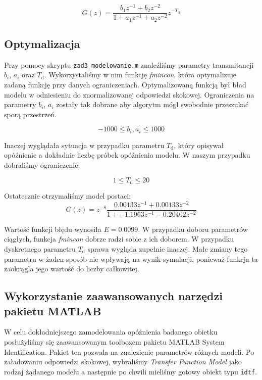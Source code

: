 \begin{equation}
G(z) = \frac{b_{\mathrm{1}} z^{-1} + b_{\mathrm{2}} z^{-2}}{1 + a_{\mathrm{1}} z^{-1} + a_{\mathrm{2}} z^{-2}} z^{-T_{\mathrm{d}}}
\end{equation}

\subsection{Optymalizacja}
Przy pomocy skryptu \verb+zad3_modelowanie.m+ znaleźliśmy parametry transmitancji 
$b_{i}$, $a_{i}$ oraz $T_{\mathrm{d}}$. Wykorzystaliśmy w nim funkcję \emph{fmincon}, 
która optymalizuje zadaną funkcję przy danych ograniczeniach. Optymalizowaną funkcją 
był bład modelu w odniesieniu do znormalizowanej odpowiedzi skokowej. Ograniczenia na 
parametry $b_{i}$, $a_{i}$ zostały tak dobrane aby algorytm mógł swobodnie przeszukać 
sporą przestrzeń.

$$ \num{-1000} \leq b_{i}, a_{i} \leq \num{1000} $$

Inaczej wyglądała sytuacja w przypadku parametru $T_{\mathrm{d}}$, który opisywał opóźnienie a 
dokładnie liczbę próbek opóźnienia modelu. W naszym przypadku dobraliśmy ograniczenie:

$$ \num{1} \leq T_{\mathrm{d}} \leq \num{20} $$

Ostatecznie otrzymaliśmy model postaci:
\begin{equation}
    G(z) =  z^{-8} \frac{\num{0.00133} z^{-1} + \num{0.00133} z^{-2}}{1 + \num{-1.1963} z^{-1} - \num{0.20402} z^{-2}}
\end{equation}

Wartość funkcji błędu wynosiła $E = \num{0.0099}$. W przypadku doboru parametrów ciągłych, 
funkcja \emph{fmincon} dobrze radzi sobie z ich doborem. W przypadku dyskretnego parametru 
$T_{\mathrm{d}}$ sprawa wygląda zupełnie inaczej. Małe zmiany tego parametru w żaden sposób
nie wpływają na wynik symulacji, ponieważ funkcja ta zaokrągla jego wartość do liczby całkowitej.

\subsection{Wykorzystanie zaawansowanych narzędzi pakietu MATLAB}
W celu dokładniejszego zamodelowania opóźnienia badanego obietku posłużyliśmy 
się zaawansowanym toolboxem pakietu MATLAB System Identification. Pakiet ten 
pozwala na znalezienie parametrów różnych modeli. Po załadowaniu odpowiedzi skokowej,
wybraliśmy \emph{Transfer Function Model} jako rodzaj żądanego modelu a następnie po chwili mieliśmy gotowy obiekt typu \verb+idtf+. 

